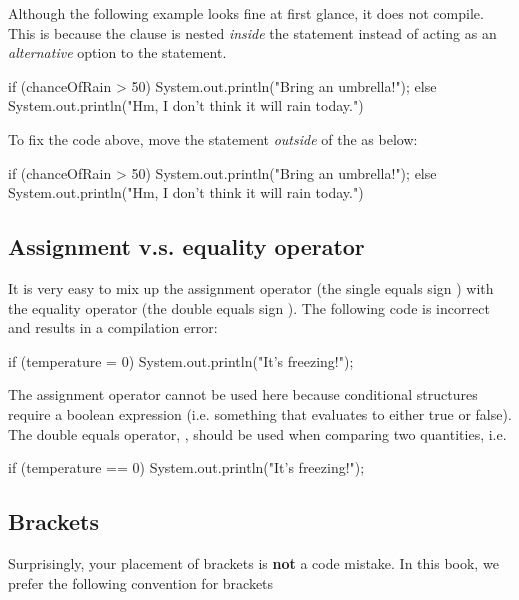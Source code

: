 Although the following example looks fine at first glance, it does not compile. This is because the  clause is nested \emph{inside} the  statement instead of acting as an \emph{alternative} option to the  statement.

\begin{code}
if (chanceOfRain > 50) 
{
    System.out.println("Bring an umbrella!");
    else 
    {
        System.out.println("Hm, I don't think it will rain today.")
    }
}
\end{code}

\noindent To fix the code above, move the  statement \emph{outside} of the  as below:

\begin{code}
if (chanceOfRain > 50) 
{
    System.out.println("Bring an umbrella!");
} 
else 
{
    System.out.println("Hm, I don't think it will rain today.")
}
\end{code}

\subsection{Assignment v.s. equality operator}
It is very easy to mix up the assignment operator (the single equals sign \ic{=}) with the equality operator (the double equals sign \ic{==}). The following code is incorrect and results in a compilation error:

\begin{code}
if (temperature = 0) 
{
    System.out.println("It's freezing!");
}
\end{code}

\noindent The assignment operator cannot be used here because conditional structures require a boolean expression (i.e. something that evaluates to either true or false). The double equals operator, \ic{==}, should be used when comparing two quantities, i.e.

\begin{code}
if (temperature == 0) 
{
    System.out.println("It's freezing!");
}
\end{code}

\subsection{Brackets}

Surprisingly, your placement of brackets is \textbf{not} a code mistake. In this book, we prefer the following convention for brackets

